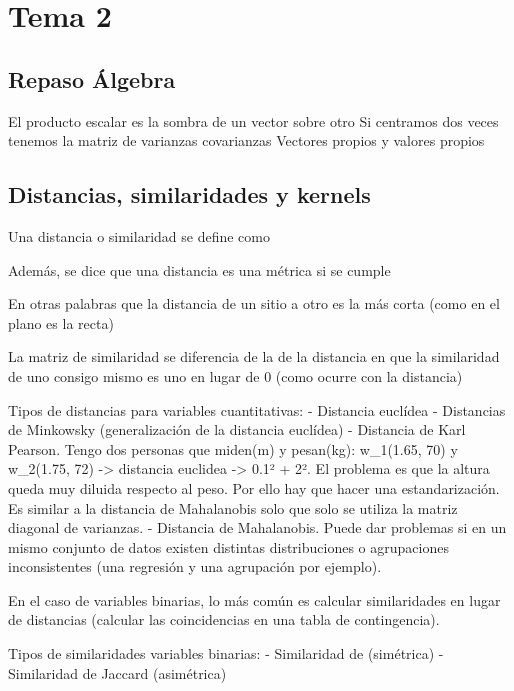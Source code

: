 \section{Tema 2}
\subsection{Repaso Álgebra}
El producto escalar es la sombra de un vector sobre otro
Si centramos dos veces tenemos la matriz de varianzas covarianzas
Vectores propios y valores propios

\subsection{Distancias, similaridades y kernels}
Una distancia o similaridad se define como

Además, se dice que una distancia es una métrica si se cumple

En otras palabras que la distancia de un sitio a otro es la más corta (como en el plano es la recta)

La matriz de similaridad se diferencia de la de la distancia en que la similaridad de uno consigo mismo es uno en lugar de 0 (como ocurre con la distancia)

Tipos de distancias para variables cuantitativas:
- Distancia euclídea
- Distancias de Minkowsky (generalización de la distancia euclídea)
- Distancia de Karl Pearson. Tengo dos personas que miden(m) y pesan(kg): w_1(1.65, 70) y w_2(1.75, 72) -> distancia euclidea -> 0.1² + 2². El problema es que la altura queda muy diluida respecto al peso. Por ello hay que hacer una estandarización. Es similar a la distancia de Mahalanobis solo que solo se utiliza la matriz diagonal de varianzas.
- Distancia de Mahalanobis. Puede dar problemas si en un mismo conjunto de datos existen  distintas distribuciones o agrupaciones inconsistentes (una regresión y una agrupación por ejemplo).


En el caso de variables binarias, lo más común es calcular similaridades en lugar de distancias (calcular las coincidencias en una tabla de contingencia).

Tipos de similaridades variables binarias:
- Similaridad de (simétrica)
- Similaridad de Jaccard (asimétrica)



